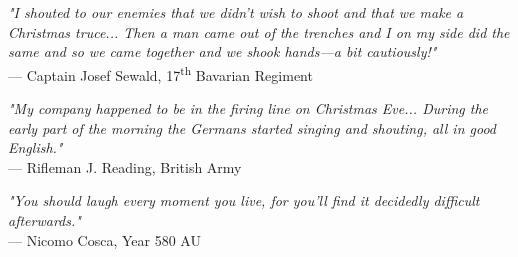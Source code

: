 \begin{flushright}
\emph{"I shouted to our enemies that we didn’t wish to shoot and that we make a Christmas truce... Then a man came out of the trenches and I on my side did the same and so we came together and we shook hands—a bit cautiously!"}\\
— Captain Josef Sewald, 17\textsuperscript{th} Bavarian Regiment
\end{flushright}
\vspace{2em}
\begin{flushright}
\emph{"My company happened to be in the firing line on Christmas Eve... During the early part of the morning the Germans started singing and shouting, all in good English."}\\
— Rifleman J. Reading, British Army
\end{flushright}
\vspace{2em}
\begin{flushright}
\emph{"You should laugh every moment you live, for you'll find it decidedly difficult afterwards."}\\
— Nicomo Cosca, Year 580 AU
\end{flushright}
